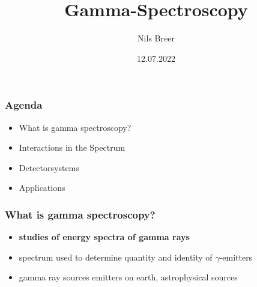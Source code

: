\documentclass[aspectratio=1610, 12pt]{beamer}
\title{Gamma-Spectroscopy}
\author[N.Breer]{Nils Breer}
\institute{Fakultät Physik}
\date{12.07.2022}
\begin{document}
\maketitle

\begin{frame}\frametitle{Agenda}
  \begin{itemize}
    \item What is gamma spectroscopy?
    \item Interactions in the Spectrum
    \item Detectorsystems
    \item Applications
  \end{itemize}
\end{frame}

\begin{frame}\frametitle{What is gamma spectroscopy?}
  \begin{itemize}
    \item \textbf{studies of energy spectra of gamma rays}
    \item spectrum used to determine quantity and identity of $\gamma$-emitters
    \item gamma ray sources emitters on earth, astrophysical sources
  \end{itemize}
\end{frame}
\end{document}
